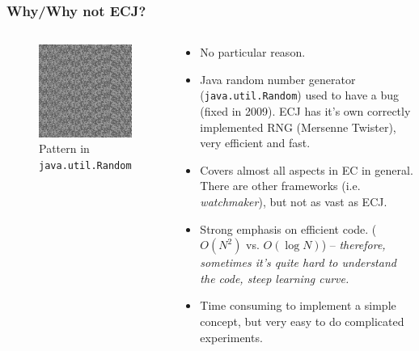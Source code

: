 \documentclass{beamer}
\begin{document}
\begin{frame}
	\frametitle{Why/Why not ECJ?}
	\begin{columns}[c]
		\column{1.5in}
			\begin{figure}
				\centering
				\includegraphics[width=1.5in,keepaspectratio]{java-bug.pdf}
				\caption{Pattern in \texttt{java.util.Random}}
			\end{figure}
		\column{3in}
		\begin{scriptsize}
			\begin{itemize}
				\setlength{\itemsep}{0.30cm}
				\item No particular reason.
				\item Java random number generator (\texttt{java.util.Random}) used to have a bug (fixed in 2009). ECJ has it's own correctly implemented RNG (Mersenne Twister), very efficient and fast.
				\item Covers almost all aspects in EC in general. There are other frameworks (i.e. \textit{watchmaker}), but not as vast as ECJ.
				\item Strong emphasis on efficient code. (\(O(N^2)\) vs. \(O(\log N)\)) -- \textit{therefore, sometimes it's quite hard to understand the code, steep learning curve.}
				\item Time consuming to implement a simple concept, but very easy to do complicated experiments.
			\end{itemize}
		\end{scriptsize}
	\end{columns}
\end{frame}
\end{document}
